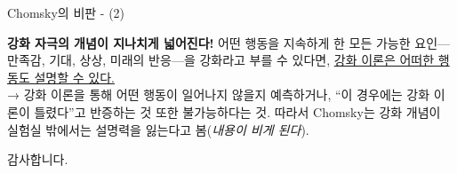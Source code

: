 \documentclass[aspectratio=169]{beamer}
\begin{document}
\begin{frame}{Chomsky의 비판 - (2)}
  \begin{alertblock}{\textbf{강화 자극의 개념이 지나치게 넓어진다!}}
    \medskip
     어떤 행동을 지속하게 한 모든 가능한 요인—만족감, 기대, 상상, 미래의 반응—을 강화라고 부를 수 있다면, \underline{강화 이론은 어떠한 행동도 설명할 수 있다.}
    \newline
    \\ → 강화 이론을 통해 어떤 행동이 일어나지 않을지 예측하거나, “이 경우에는 강화 이론이 틀렸다”고 반증하는 것 또한 불가능하다는 것. 따라서 Chomsky는 강화 개념이 실험실 밖에서는 설명력을 잃는다고 봄(\textit{내용이 비게 된다}).
  \end{alertblock}
\end{frame}

\begin{frame}
  \centering
  \huge 감사합니다.
\end{frame}
\end{document}
